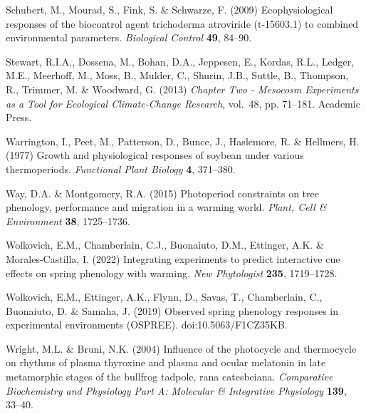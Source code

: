 \documentclass[11pt]{article}
\begin{document}
\begin{thebibliography}{49}
Schubert, M., Mourad, S., Fink, S. \& Schwarze, F. (2009) Ecophysiological
  responses of the biocontrol agent trichoderma atroviride (t-15603.1) to
  combined environmental parameters. \emph{Biological Control} \textbf{49},
  84--90.

Stewart, R.I.A., Dossena, M., Bohan, D.A., Jeppesen, E., Kordas, R.L., Ledger,
  M.E., Meerhoff, M., Moss, B., Mulder, C., Shurin, J.B., Suttle, B., Thompson,
  R., Trimmer, M. \& Woodward, G. (2013) \emph{Chapter Two - Mesocosm
  Experiments as a Tool for Ecological Climate-Change Research}, vol.~48, pp.
  71--181. Academic Press.

Warrington, I., Peet, M., Patterson, D., Bunce, J., Haslemore, R. \& Hellmers,
  H. (1977) Growth and physiological responses of soybean under various
  thermoperiods. \emph{Functional Plant Biology} \textbf{4}, 371--380.

Way, D.A. \& Montgomery, R.A. (2015) Photoperiod constraints on tree phenology,
  performance and migration in a warming world. \emph{Plant, Cell \&
  Environment} \textbf{38}, 1725--1736.

Wolkovich, E.M., Chamberlain, C.J., Buonaiuto, D.M., Ettinger, A.K. \&
  Morales-Castilla, I. (2022) Integrating experiments to predict interactive
  cue effects on spring phenology with warming. \emph{New Phytologist}
  \textbf{235}, 1719--1728.

Wolkovich, E.M., Ettinger, A.K., Flynn, D., Savas, T., Chamberlain, C.,
  Buonaiuto, D. \& Samaha, J. (2019) Observed spring phenology responses in
  experimental environments (\uppercase{OSPREE}). doi:10.5063/F1CZ35KB.

Wright, M.L. \& Bruni, N.K. (2004) Influence of the photocycle and thermocycle
  on rhythms of plasma thyroxine and plasma and ocular melatonin in late
  metamorphic stages of the bullfrog tadpole, rana catesbeiana.
  \emph{Comparative Biochemistry and Physiology Part A: Molecular & Integrative
  Physiology} \textbf{139}, 33--40.


\end{thebibliography}
\end{document}
